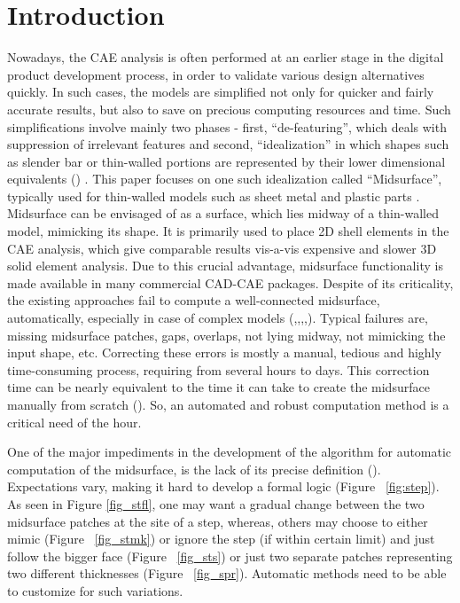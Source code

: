 \section{Introduction}\label{sec:intro}

Nowadays, the CAE analysis is often performed at an earlier stage in the digital product development process, in order to validate various design alternatives quickly. In such cases, the models are simplified not only for quicker and fairly accurate results, but also to save on precious computing resources and time. Such simplifications involve mainly two phases - first, ``de-featuring'', which deals with suppression of irrelevant features and second, ``idealization'' in which shapes such as slender bar or thin-walled portions are represented by their lower dimensional equivalents (\cite{Dabke1994}) . This paper focuses on one such idealization called ``Midsurface'', typically used for thin-walled models such as sheet metal and plastic parts \cite{FEMBook2009} .  
Midsurface can be envisaged of as a surface, which lies midway of a thin-walled model, mimicking its shape.  It is primarily used to place 2D shell elements in the CAE analysis, which give comparable results vis-a-vis  expensive and slower 3D solid element analysis. Due to this crucial advantage, midsurface functionality is made available  in many commercial CAD-CAE packages. Despite of its criticality, the existing approaches fail to compute a well-connected midsurface, automatically, especially in case of complex models (\cite{Robinson2006},\cite{Automex},\cite{Woo2013},\cite{Stolt2006a},\cite{Lockett2008}). Typical failures are, missing midsurface patches, gaps, overlaps, not lying midway, not mimicking the input shape, etc. Correcting these errors is mostly a manual, tedious and highly time-consuming process, requiring from several hours to days. This correction time can be nearly equivalent to the time it can take to create the midsurface manually from scratch (\cite{Stolt2006}).  So, an automated and robust computation method is a critical need of the hour.

One of the major impediments in the development of the algorithm for automatic computation of the midsurface, is the lack of its precise definition (\cite{Ramanathan2004}).  Expectations vary, making it hard to develop a formal logic (Figure ~\ref{fig:step}). As seen in Figure \ref{fig_stfl}, one may want a gradual change between the two midsurface patches at the site of a step, whereas, others may choose to either mimic (Figure ~\ref{fig_stmk}) or ignore the step (if within certain limit) and just follow the bigger face (Figure ~\ref{fig_sts}) or just two separate patches representing two different thicknesses  (Figure ~\ref{fig_spr}). Automatic methods need to be able to customize for such variations.


